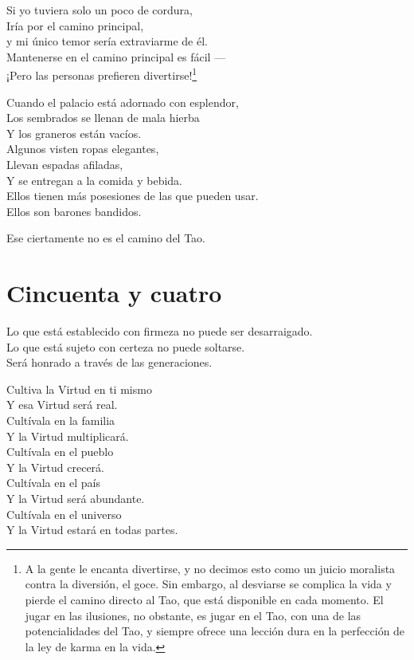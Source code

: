 \documentclass[book,b5paper,hidelinks,final]{memoir}
\begin{document}
	Si yo tuviera solo un poco de cordura,\\
	Iría por el camino principal,\\
	y mi único temor sería extraviarme de él.\\
	Mantenerse en el camino principal es fácil ---\\
	¡Pero las personas prefieren divertirse!\footnote{A la gente le encanta divertirse, y no decimos esto como un juicio
		moralista contra la diversión, el goce. Sin embargo, al desviarse se
		complica la vida y pierde el camino directo al Tao, que está disponible
		en cada momento. El jugar en las ilusiones, no obstante, es jugar en el
		Tao, con una de las potencialidades del Tao, y siempre ofrece una
		lección dura en la perfección de la ley de karma en la vida.}
	
	Cuando el palacio está adornado con esplendor,\\
	Los sembrados se llenan de mala hierba\\
	Y los graneros están vacíos.\\
	Algunos visten ropas elegantes,\\
	Llevan espadas afiladas,\\
	Y se entregan a la comida y bebida.\\
	Ellos tienen más posesiones de las que pueden usar.\\
	Ellos son barones bandidos.
	
	Ese ciertamente no es el camino del Tao.
	
	\chapter*{Cincuenta y cuatro}
	
	Lo que está establecido con firmeza no puede ser desarraigado.\\
	Lo que está sujeto con certeza no puede soltarse.\\
	Será honrado a través de las generaciones.
	
	Cultiva la Virtud en ti mismo\\
	Y esa Virtud será real.\\
	Cultívala en la familia\\
	Y la Virtud multiplicará.\\
	Cultívala en el pueblo\\
	Y la Virtud crecerá.\\
	Cultívala en el país\\
	Y la Virtud será abundante.\\
	Cultívala en el universo\\
	Y la Virtud estará en todas partes.
	
\end{document}
